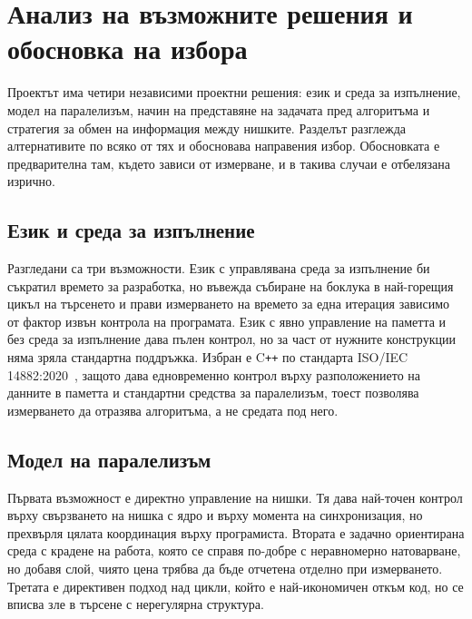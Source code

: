 \section{Анализ на възможните решения и обосновка на избора}
\label{sec:alternatives}

Проектът има четири независими проектни решения: език и среда за изпълнение, модел на
паралелизъм, начин на представяне на задачата пред алгоритъма и стратегия за обмен на
информация между нишките. Разделът разглежда алтернативите по всяко от тях и
обосновава направения избор. Обосновката е предварителна там, където зависи от
измерване, и в такива случаи е отбелязана изрично.

\subsection{Език и среда за изпълнение}
\label{subsec:alt-language}

Разгледани са три възможности. Език с управлявана среда за изпълнение би съкратил
времето за разработка, но въвежда събиране на боклука в най-горещия цикъл на
търсенето и прави измерването на времето за една итерация зависимо от фактор извън
контрола на програмата. Език с явно управление на паметта и без среда за изпълнение
дава пълен контрол, но за част от нужните конструкции няма зряла стандартна
поддръжка. Избран е C\texttt{++} по стандарта ISO/IEC 14882:2020~\cite{iso_cpp20},
защото дава едновременно контрол върху разположението на данните в паметта и
стандартни средства за паралелизъм, тоест позволява измерването да отразява
алгоритъма, а не средата под него.

\subsection{Модел на паралелизъм}
\label{subsec:alt-parallelism}

Първата възможност е директно управление на нишки. Тя дава най-точен контрол върху
свързването на нишка с ядро и върху момента на синхронизация, но прехвърля цялата
координация върху програмиста. Втората е задачно ориентирана среда с крадене на
работа, която се справя по-добре с неравномерно натоварване, но добавя слой, чиято
цена трябва да бъде отчетена отделно при измерването. Третата е директивен подход над
цикли, който е най-икономичен откъм код, но се вписва зле в търсене с нерегулярна
структура.


